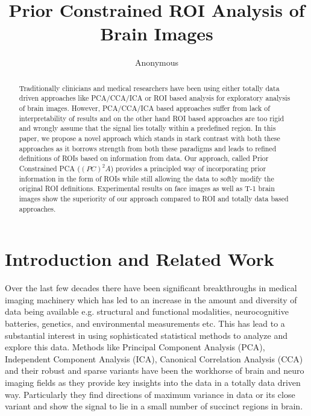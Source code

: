 \documentclass{llncs}
\begin{document}
\vspace{-0.1in}
\title{Prior Constrained ROI Analysis of Brain Images}
\author{Anonymous}
\maketitle              
\begin{abstract}
 Traditionally clinicians and medical researchers have been using either totally data driven approaches like PCA/CCA/ICA or ROI based analysis for exploratory analysis of brain images. However, PCA/CCA/ICA based approaches suffer from lack of interpretability of results and on the other hand ROI based approaches are too rigid and wrongly assume that the signal lies totally within a predefined region. In this paper, we propose a novel approach which stands in stark contrast with both these approaches as it borrows strength from both these paradigms and leads to refined definitions of ROIs based on information from data. Our approach, called Prior Constrained PCA ($(PC)^2A$) provides a principled way of incorporating prior information in the form of ROIs while still allowing the data to softly modify the original ROI definitions. Experimental results on face images as well as T-1 brain images show the superiority of our approach compared to ROI and totally data based approaches.    

\end{abstract}

\section{Introduction and Related Work}
Over the last  few decades there have been significant breakthroughs in medical imaging machinery which has led to an increase in the amount and diversity of data being available e.g. structural and functional modalities, neurocognitive batteries, genetics, and environmental measurements etc. This has lead to a substantial interest in using sophisticated statistical methods to analyze and explore this data. Methods like Principal Component Analysis (PCA), Independent Component Analysis (ICA), Canonical Correlation Analysis (CCA) and their robust and sparse variants have been the workhorse of brain and neuro imaging fields as they provide key insights into the data in a totally data driven way. Particularly they find directions of maximum variance in data or its close variant and show the signal to lie in a small number of succinct regions in brain. 
\end{document}
